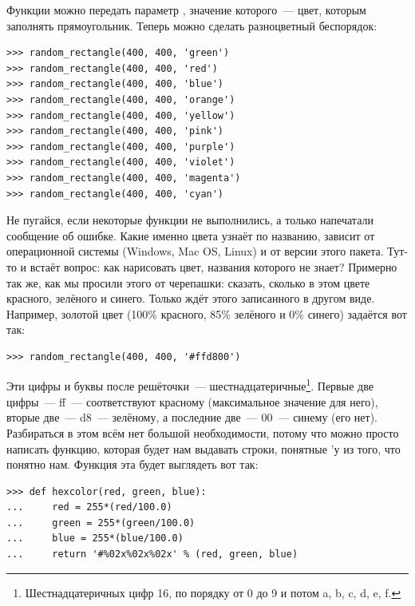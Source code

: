 Функции  можно передать параметр , значение которого — цвет, которым заполнять прямоугольник. Теперь можно сделать разноцветный беспорядок:

\begin{listing}
\begin{verbatim}
>>> random_rectangle(400, 400, 'green')
>>> random_rectangle(400, 400, 'red')
>>> random_rectangle(400, 400, 'blue')
>>> random_rectangle(400, 400, 'orange')
>>> random_rectangle(400, 400, 'yellow')
>>> random_rectangle(400, 400, 'pink')
>>> random_rectangle(400, 400, 'purple')
>>> random_rectangle(400, 400, 'violet')
>>> random_rectangle(400, 400, 'magenta')
>>> random_rectangle(400, 400, 'cyan')
\end{verbatim}
\end{listing}

Не пугайся, если некоторые функции не выполнились, а только напечатали сообщение об ошибке. Какие именно цвета  узнаёт по названию, зависит от операционной системы (Windows, Mac OS, Linux) и от версии этого пакета. Тут-то и встаёт вопрос: как нарисовать  цвет, названия которого  не знает? Примерно так же, как мы просили этого от черепашки: сказать, сколько в этом цвете красного, зелёного и синего. Только  ждёт этого записанного в другом виде. Например, золотой цвет (100\% красного, 85\% зелёного и 0\% синего) задаётся вот так:

\begin{listing}
\begin{verbatim}
>>> random_rectangle(400, 400, '#ffd800')
\end{verbatim}
\end{listing}

Эти цифры и буквы после решёточки — шестнадцатеричные\footnote{Шестнадцатеричных цифр 16, по порядку от 0 до 9 и потом a, b, c, d, e, f.}. Первые две цифры — ff — соответствуют красному (максимальное значение для него), вторые две — d8 — зелёному, а последние две — 00 — синему (его нет). Разбираться в этом всём нет большой необходимости, потому что можно просто написать функцию, которая будет нам выдавать строки, понятные 'у из того, что понятно нам. Функция эта будет выглядеть вот так:

\begin{listing}
\begin{verbatim}
>>> def hexcolor(red, green, blue):
...     red = 255*(red/100.0)
...     green = 255*(green/100.0)
...     blue = 255*(blue/100.0)
...     return '#%02x%02x%02x' % (red, green, blue)
\end{verbatim}
\end{listing}

